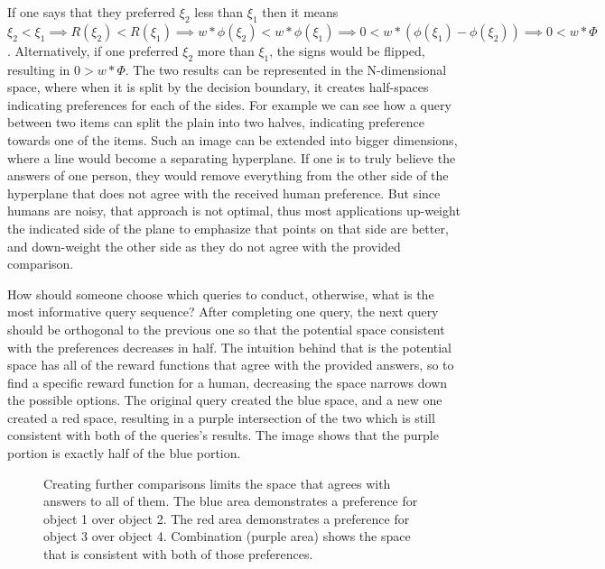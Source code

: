 \documentclass[
  letterpaper,
  numbers=noenddot,
  DIV=11]{scrreprt}
\theoremstyle{plain}
\theoremstyle{definition}
\theoremstyle{remark}
\begin{document}
If one says that they preferred \(\xi_2\) less than \(\xi_1\) then it
means
\(\xi_2 < \xi_1 \implies R(\xi_2) < R(\xi_1) \implies w * \phi(\xi_2) < w * \phi(\xi_1) \implies 0 < w * (\phi(\xi_1) - \phi(\xi_2)) \implies 0 < w * \Phi\).
Alternatively, if one preferred \(\xi_2\) more than \(\xi_1\), the signs
would be flipped, resulting in \(0 > w * \Phi\). The two results can be
represented in the N-dimensional space, where when it is split by the
decision boundary, it creates half-spaces indicating preferences for
each of the sides. For example we can see how a query between two items
can split the plain into two halves, indicating preference towards one
of the items. Such an image can be extended into bigger dimensions,
where a line would become a separating hyperplane. If one is to truly
believe the answers of one person, they would remove everything from the
other side of the hyperplane that does not agree with the received human
preference. But since humans are noisy, that approach is not optimal,
thus most applications up-weight the indicated side of the plane to
emphasize that points on that side are better, and down-weight the other
side as they do not agree with the provided comparison.

How should someone choose which queries to conduct, otherwise, what is
the most informative query sequence? After completing one query, the
next query should be orthogonal to the previous one so that the
potential space consistent with the preferences decreases in half. The
intuition behind that is the potential space has all of the reward
functions that agree with the provided answers, so to find a specific
reward function for a human, decreasing the space narrows down the
possible options. The original query created the blue space, and a new
one created a red space, resulting in a purple intersection of the two
which is still consistent with both of the queries's results. The image
shows that the purple portion is exactly half of the blue portion.

\begin{figure}


\caption{\label{fig-2dspace}Creating further comparisons limits the
space that agrees with answers to all of them. The blue area
demonstrates a preference for object 1 over object 2. The red area
demonstrates a preference for object 3 over object 4. Combination
(purple area) shows the space that is consistent with both of those
preferences.}

\end{figure}%
\end{document}
